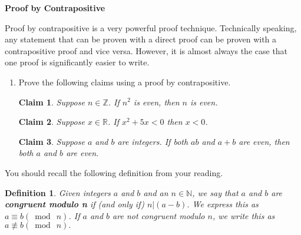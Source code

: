 \documentclass[12 pt]{article}
\newcommand{\R}{\mathbb{R}}
\newcommand{\Z}{\mathbb{Z}}
\newcommand{\N}{\mathbb{N}}
\theoremstyle{definition}
\theoremstyle{plain}
\theoremstyle{mytheorem}
\newtheorem{claim}{Claim}
\theoremstyle{myexample}
\theoremstyle{mydefinition}
\newtheorem{definition}{Definition}
\begin{document}
\begin{center}
\textbf{Proof by Contrapositive}
\end{center}

Proof by contrapositive is a very powerful proof technique.  Technically speaking, any statement that can be proven with a direct proof can be proven with a contrapositive proof and vice versa.  However, it is almost always the case that one proof is significantly easier to write.
\begin{center}
\end{center}

\begin{enumerate}
\item Prove the following claims using a proof by contrapositive.

\begin{claim}  Suppose $n \in \Z$.  If $n^2$ is even, then $n$ is even.
\end{claim}

\vspace{3in}


\begin{claim}  Suppose $x \in \R$.  If $x^2+5x<0$ then $x<0$.
\end{claim}

\newpage

\begin{claim}  Suppose $a$ and $b$ are integers.  If both $ab$ and $a+b$ are even, then both $a$ and $b$ are even.
\end{claim}
\end{enumerate}

\vspace{7in}

\noindent  You should recall the following definition from your reading.
\begin{definition}  Given integers $a$ and $b$ and an $n \in \N$, we say that $a$ and $b$ are \textbf{congruent modulo n} if (and only if) $n|(a-b)$.  We express this as $ a \equiv b (\bmod \ n)$.  If $a$ and $b$ are not congruent modulo $n$, we write this as $a \not\equiv b (\bmod \ n).$  
\end{definition}
\end{document}

